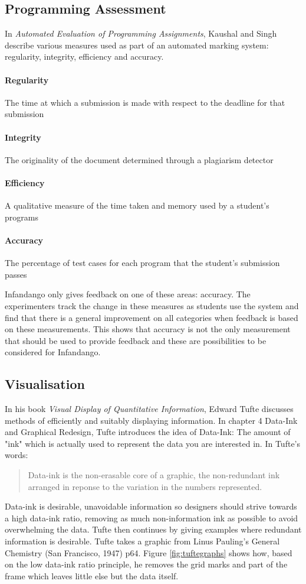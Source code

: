 \subsection{Programming Assessment}
In {\it Automated Evaluation of Programming Assignments}\cite{automate_evaluation}, Kaushal and Singh describe various measures used as part of an automated marking system: regularity, integrity, efficiency and accuracy. 
\paragraph*{Regularity} The time at which a submission is made with respect to the deadline for that submission
\paragraph*{Integrity} The originality of the document determined through a plagiarism detector
\paragraph*{Efficiency} A qualitative measure of the time taken and memory used by a student's programs
\paragraph*{Accuracy} The percentage of test cases for each program that the student's submission passes

Infandango only gives feedback on one of these areas: accuracy. The experimenters track the change in these measures as students use the system and find that there is a general improvement on all categories when feedback is based on these measurements. This shows that accuracy is not the only measurement that should be used to provide feedback and these are possibilities to be considered for Infandango.

\subsection{Visualisation}
In his book {\it Visual Display of Quantitative Information}\cite{visual_explanations}, Edward Tufte discusses methods of efficiently and suitably displaying information. In chapter 4 Data-Ink and Graphical Redesign, Tufte introduces the idea of Data-Ink: The amount of "ink" which is actually used to represent the data you are interested in. In Tufte's words:

\begin{quote}Data-ink is the non-erasable core of a graphic, the non-redundant ink arranged in reponse to the variation in the numbers represented.
\end{quote}
Data-ink is desirable, unavoidable information so designers should strive towards a high data-ink ratio, removing as much non-information ink as possible to avoid overwhelming the data. Tufte then continues by giving examples where redundant information is desirable.
Tufte takes a graphic from Linus Pauling's General Chemistry (San Francisco, 1947) p64. Figure \ref{fig:tuftegraphs} shows how, based on the low data-ink ratio principle, he removes the grid marks and part of the frame which leaves little else but the data itself.

